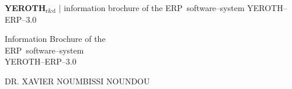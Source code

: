 \documentclass[a4paper, 10pt]{article}
\newcommand{\erpsoftwaresystem}{ERP~software--system\xspace}
\newcommand{\yerothrd}{\textcolor{yerothColorGreen}
			{\textsc{\textcolor{yerothColorRed}{YEROTH}}$_{\text{r\&d}}$\xspace}}
\newcommand{\yerotherpblack}{YEROTH--ERP--$3.0$\xspace}
\newcommand{\myfullacademicname}{DR. XAVIER NOUMBISSI NOUNDOU\xspace}
\begin{document}
\thispagestyle{OnlyFirstPage}

{\bf \LARGE \yerothrd} {| \sc \scriptsize information brochure of the \erpsoftwaresystem \yerotherpblack}

\vspace{2.0em}

\begin{center}
{\LARGE Information Brochure of the \\
    \vspace{0.3em}
    \erpsoftwaresystem \\
    \vspace{0.5em}
    \yerotherpblack}
\end{center}

\vspace{2.0em}

\begin{center}
{\large \myfullacademicname}
\end{center}

\vspace{1.0em}
\end{document}
